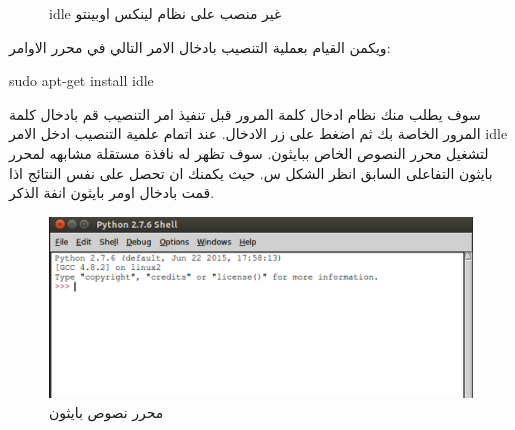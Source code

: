 \begin{enumerate}
\begin{figure}[H]
  \caption{idle غير منصب على نظام لينكس اوبينتو}
  \label{fig:startpython2}
\end{figure}
ويكمن القيام بعملية التنصيب بادخال الامر التالي في محرر الاوامر:
\begin{flushleft}
sudo apt-get install idle
\end{flushleft}
سوف يطلب منك نظام ادخال كلمة المرور قبل تنفيذ امر التنصيب قم بادخال كلمة المرور الخاصة بك ثم اضغط على زر الادخال. عند اتمام علمية التنصيب ادخل الامر idle لتشغيل محرر النصوص الخاص ببايثون. سوف تظهر له نافذة مستقلة مشابهه لمحرر بايثون التفاعلى السابق انظر الشكل س. حيث يكمنك ان تحصل على نفس النتائج اذا قمت بادخال اومر بايثون انفة الذكر.
\begin{figure}[H]
  \includegraphics[width=\linewidth]{figures/idle.png}
  \caption{محرر نصوص بايثون}
  \label{fig:startpython2}
\end{figure}
\end{enumerate}